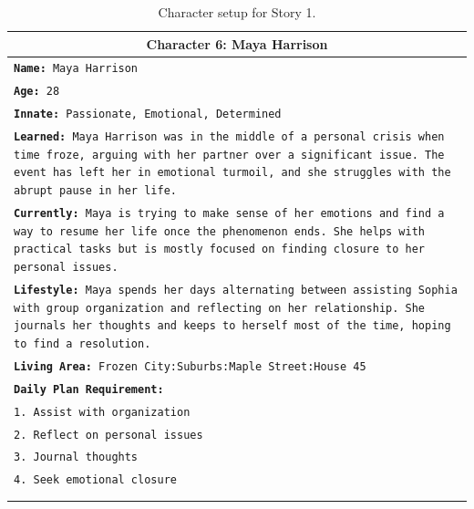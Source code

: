 \documentclass[letterpaper]{article} %
\begin{document}
\begin{small}
\begin{longtable}{p{\textwidth}}
    \multicolumn{1}{c}{\textbf{Character 6: Maya Harrison}} \\
    \midrule
    \texttt{\textbf{Name:} Maya Harrison} \\
    \texttt{\textbf{Age:} 28} \\
    \texttt{\textbf{Innate:} Passionate, Emotional, Determined} \\
    \texttt{\textbf{Learned:} Maya Harrison was in the middle of a personal crisis when time froze, arguing with her partner over a significant issue. The event has left her in emotional turmoil, and she struggles with the abrupt pause in her life.} \\
    \texttt{\textbf{Currently:} Maya is trying to make sense of her emotions and find a way to resume her life once the phenomenon ends. She helps with practical tasks but is mostly focused on finding closure to her personal issues.} \\
    \texttt{\textbf{Lifestyle:} Maya spends her days alternating between assisting Sophia with group organization and reflecting on her relationship. She journals her thoughts and keeps to herself most of the time, hoping to find a resolution.} \\
    \texttt{\textbf{Living Area:} Frozen City:Suburbs:Maple Street:House 45} \\
    \texttt{\textbf{Daily Plan Requirement:}} \\
    \texttt{1. Assist with organization} \\
    \texttt{2. Reflect on personal issues} \\
    \texttt{3. Journal thoughts} \\
    \texttt{4. Seek emotional closure} \\
    \\

    \bottomrule

    \caption{Character setup for Story 1.}
    \label{tab:story_1_character_setup}
  \end{longtable}
\end{small}
\end{document}
